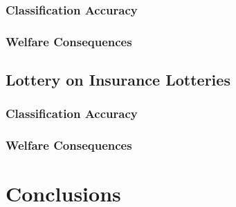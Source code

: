 \documentclass[../main.tex]{subfiles}
\begin{document}
		\subsubsection{Classification Accuracy}
		\subsubsection{Welfare Consequences}
	\subsection{ \texorpdfstring{\textcite{Hey1994}}{Hey and Orme (1994)} Lottery on \texorpdfstring{\textcite{Harrison2016}}{Harrison and Ng (2016)} Insurance Lotteries   }
		\subsubsection{Classification Accuracy}
		\subsubsection{Welfare Consequences}
\section{Conclusions}

\newpage

\printbibliography[segment=4, heading=subbibliography]
\end{document}
